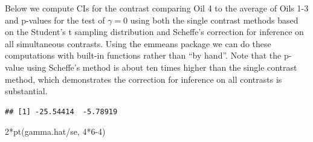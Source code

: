 \documentclass[
]{book}
\newenvironment{Shaded}{\begin{snugshade}}{\end{snugshade}}
\newcommand{\DecValTok}[1]{\textcolor[rgb]{0.00,0.00,0.81}{#1}}
\newcommand{\FloatTok}[1]{\textcolor[rgb]{0.00,0.00,0.81}{#1}}
\newcommand{\FunctionTok}[1]{\textcolor[rgb]{0.00,0.00,0.00}{#1}}
\newcommand{\NormalTok}[1]{#1}
\newcommand{\OtherTok}[1]{\textcolor[rgb]{0.56,0.35,0.01}{#1}}
\newcommand{\SpecialCharTok}[1]{\textcolor[rgb]{0.00,0.00,0.00}{#1}}
\begin{document}
Below we compute CIs for the contrast comparing Oil 4 to the average of Oils 1-3 and p-values for the test of \(\gamma = 0\) using both the single contrast methods based on the Student's t sampling distribution and Scheffe's correction for inference on all simultaneous contrasts. Using the emmeans package we can do these computations with built-in functions rather than ``by hand''. Note that the p-value using Scheff\textquotesingle e's method is about ten times higher than the single contrast method, which demonstrates the correction for inference on all contrasts is substantial.

\begin{Shaded}
\end{Shaded}

\begin{verbatim}
## [1] -25.54414  -5.78919
\end{verbatim}

\begin{Shaded}
\begin{Highlighting}[]
\DecValTok{2}\SpecialCharTok{*}\FunctionTok{pt}\NormalTok{(gamma.hat}\SpecialCharTok{/}\NormalTok{se, }\DecValTok{4}\SpecialCharTok{*}\DecValTok{6{-}4}\NormalTok{)}
\end{Highlighting}
\end{Shaded}
\end{document}
